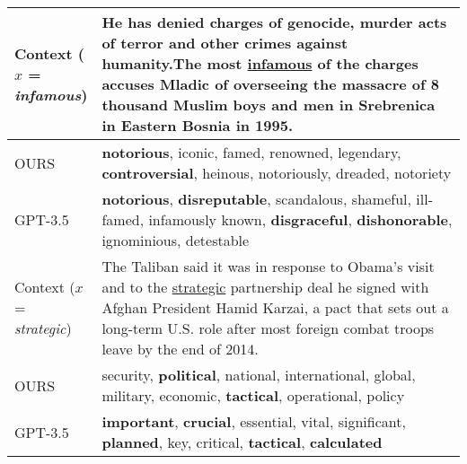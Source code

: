 \documentclass[11pt]{article}
\newcommand{\ex}[1]{\textit{#1}\xspace}
\begin{document}
\begin{table*}[t!]
\begin{center}
\begin{adjustbox}{max width=\textwidth}
\begin{tabular}{m{0.15\linewidth}m{0.9\linewidth}}
\toprule

\makecell[l]{Context \\($x$ = \ex{infamous}) }& He has denied charges of genocide, murder acts of terror and other crimes against humanity.The most \underline{infamous} of the charges accuses Mladic of overseeing the massacre  of 8 thousand Muslim boys and men in Srebrenica in Eastern Bosnia in 1995.
\\\midrule
OURS &\textbf{notorious}, iconic, famed, renowned, legendary, \textbf{controversial}, heinous, notoriously, dreaded, notoriety
\\\midrule
GPT-3.5&\textbf{notorious}, \textbf{disreputable}, scandalous, shameful, ill-famed, infamously known, \textbf{disgraceful}, \textbf{dishonorable}, ignominious, detestable
\\\midrule\midrule

\makecell[l]{Context \\($x$ = \ex{strategic}) }& The Taliban said it was in response to Obama's visit and to the \underline{strategic} partnership deal he signed with Afghan President Hamid Karzai, a pact that sets out a long-term U.S. role after most foreign combat troops leave by the end of 2014.
\\\midrule
OURS &
security, \textbf{political}, national, international, global, military, economic, \textbf{tactical}, operational, policy
\\\midrule
GPT-3.5&\textbf{important}, \textbf{crucial}, essential, vital, significant, \textbf{planned}, key, critical, \textbf{tactical}, \textbf{calculated}\\\midrule\midrule



\end{tabular}
\end{adjustbox}
\end{center}
\end{table*}
\end{document}
